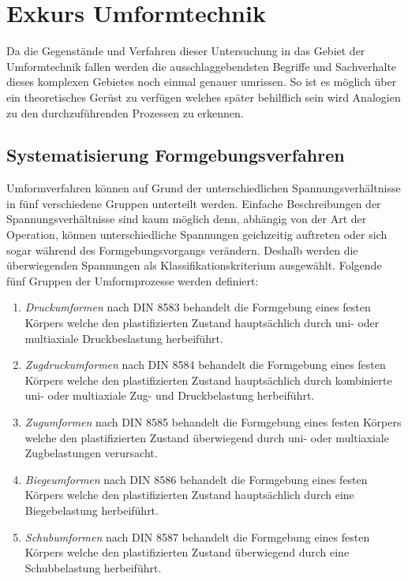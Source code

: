 \documentclass[12pt,a4paper,parskip]{scrartcl}
\begin{document}
\newpage
\section{Exkurs Umformtechnik}


Da die Gegenstände und Verfahren dieser Untersuchung in das Gebiet der Umformtechnik fallen werden die ausschlaggebendsten Begriffe und Sachverhalte dieses komplexen Gebietes noch einmal genauer umrissen. So ist es möglich über ein theoretisches Gerüst zu verfügen welches später behilflich sein wird   Analogien zu den durchzuführenden Prozessen zu erkennen.
\subsection{Systematisierung Formgebungsverfahren}
Umformverfahren können
auf Grund der unterschiedlichen Spannungsverhältnisse in fünf verschiedene Gruppen unterteilt werden. Einfache Beschreibungen der Spannungsverhältnisse sind kaum möglich denn,  abhängig von der Art der Operation, können  unterschiedliche Spannungen geichzeitig auftreten oder sich sogar  während des Formgebungsvorgangs verändern. Deshalb werden die überwiegenden Spannungen als Klassifikationskriterium ausgewählt. Folgende fünf Gruppen der Umformprozesse werden definiert:
\begin{enumerate}
\item \emph{Druckumformen} nach DIN 8583 behandelt die Formgebung eines festen Körpers  welche den  plastifizierten  Zustand hauptsächlich durch uni- oder multiaxiale Druckbeslastung herbeiführt.
\item \emph{Zugdruckumformen} nach DIN 8584 behandelt die Formgebung eines festen Körpers  welche den plastifizierten Zustand  hauptsächlich durch kombinierte uni- oder multiaxiale Zug- und Druckbelastung herbeiführt.
\item \emph{Zugumformen} nach DIN 8585 behandelt die Formgebung eines festen Körpers welche den plastifizierten Zustand überwiegend durch uni- oder multiaxiale Zugbelastungen verursacht.
\item \emph{Biegeumformen} nach DIN 8586 behandelt die Formgebung eines festen Körpers welche den plastifizierten Zustand hauptsächlich durch eine Biegebelastung herbeiführt.
\item \emph{Schubumformen} nach DIN 8587 behandelt die Formgebung eines festen Körpers welche den plastifizierten Zustand überwiegend durch eine Schubbelastung herbeiführt.

\end{enumerate}
\end{document}
